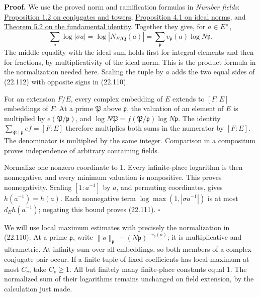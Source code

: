 \documentclass[
  11pt,
  a4paper,
]{article}
\begin{document}
\textbf{Proof.} We use the proved norm and ramification formulas in
\emph{Number fields}:
\href{https://kokunoyumeto.github.io/open-math-courses-public/courses/NT-ANT/algebraic-integers-and-rings-of-integers.html\#3-multiplication-as-a-linear-transformation}{Proposition
1.2 on conjugates and towers},
\href{https://kokunoyumeto.github.io/open-math-courses-public/courses/NT-ANT/norms-class-groups-and-modules-over-dedekind-domains.html\#counting-residue-classes}{Proposition
4.1 on ideal norms}, and
\href{https://kokunoyumeto.github.io/open-math-courses-public/courses/NT-ANT/decomposition-of-primes-in-extensions.html\#multiplicity-residue-degree-and-the-fundamental-identity}{Theorem
5.2 on the fundamental identity}. Together they give, for
\(a\in E^\times\), \[
 \sum_\sigma\log|\sigma a|
 =\log|N_{E/\mathbf Q}(a)|
 =\sum_{\mathfrak p}v_{\mathfrak p}(a)\log N\mathfrak p .
 \tag{22.112}
\] The middle equality with the ideal sum holds first for integral
elements and then for fractions, by multiplicativity of the ideal norm.
This is the product formula in the normalization needed here. Scaling
the tuple by \(a\) adds the two equal sides of (22.112) with opposite
signs in (22.110).

For an extension \(F/E\), every complex embedding of \(E\) extends to
\([F:E]\) embeddings of \(F\). At a prime \(\mathfrak P\) above
\(\mathfrak p\), the valuation of an element of \(E\) is multiplied by
\(e(\mathfrak P/\mathfrak p)\), and
\(\log N\mathfrak P=f(\mathfrak P/\mathfrak p)\log N\mathfrak p\). The
identity \(\sum_{\mathfrak P\mid\mathfrak p}ef=[F:E]\) therefore
multiplies both sums in the numerator by \([F:E]\). The denominator is
multiplied by the same integer. Comparison in a compositum proves
independence of arbitrary containing fields.

Normalize one nonzero coordinate to \(1\). Every infinite-place
logarithm is then nonnegative, and every minimum valuation is
nonpositive. This proves nonnegativity. Scaling \([1:a^{-1}]\) by \(a\),
and permuting coordinates, gives \(h(a^{-1})=h(a)\). Each nonnegative
term \(\log\max(1,|\sigma a^{-1}|)\) is at most \(d_Eh(a^{-1})\);
negating this bound proves (22.111). \(\square\)

We will use local maximum estimates with precisely the normalization in
(22.110). At a prime \(\mathfrak p\), write
\(\|a\|_{\mathfrak p}=(N\mathfrak p)^{-v_{\mathfrak p}(a)}\); it is
multiplicative and ultrametric. At infinity sum over all embeddings, so
both members of a complex-conjugate pair occur. If a finite tuple of
fixed coefficients has local maximum at most \(C_v\), take \(C_v\ge1\).
All but finitely many finite-place constants equal \(1\). The normalized
sum of their logarithms remains unchanged on field extension, by the
calculation just made.
\end{document}
